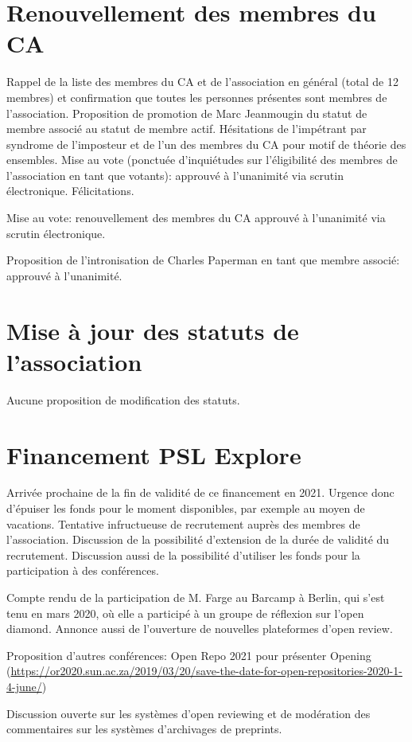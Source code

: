 \documentclass[a4paper]{article}
\begin{document}
\section{Renouvellement des membres du CA}
    Rappel de la liste des membres du CA et de l'association en général (total de 12 membres) et confirmation que toutes les personnes présentes sont membres de l'association.
    Proposition de promotion de Marc Jeanmougin du statut de membre associé au statut de membre actif. Hésitations de l'impétrant par syndrome de l'imposteur et de l'un des membres du CA pour motif de théorie des ensembles. 
    Mise au vote (ponctuée d'inquiétudes sur l'éligibilité des membres de l'association en tant que votants): approuvé à l'unanimité via scrutin électronique. Félicitations. 

    Mise au vote: renouvellement des membres du CA approuvé à l'unanimité via scrutin électronique.

Proposition de l'intronisation de Charles Paperman en tant que membre associé: approuvé à l'unanimité. 


\section{Mise à jour des statuts de l'association}
Aucune proposition de modification des statuts. 

\section{Financement PSL Explore}
Arrivée prochaine de la fin de validité de ce financement en 2021. Urgence donc d'épuiser les fonds pour le moment disponibles, par exemple au moyen de vacations. 
Tentative infructueuse de recrutement auprès des membres de l'association. Discussion de la possibilité d'extension de la durée de validité du recrutement. Discussion aussi de la possibilité d'utiliser les fonds pour la participation à des conférences.

Compte rendu de la participation de M. Farge au Barcamp à Berlin, qui s'est tenu en mars 2020, où elle a participé à un groupe de réflexion sur l'open diamond. Annonce aussi de l'ouverture de nouvelles plateformes d'open review. 

Proposition d'autres conférences: Open Repo 2021 pour présenter Opening (\url{https://or2020.sun.ac.za/2019/03/20/save-the-date-for-open-repositories-2020-1-4-june/})

Discussion ouverte sur les systèmes d'open reviewing et de modération des commentaires sur les systèmes d'archivages de preprints. 
\end{document}
